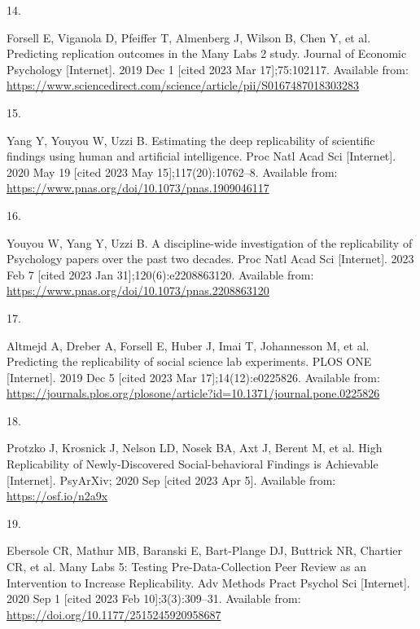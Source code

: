 \documentclass[
  english,
  a4paper,
]{article}
\newlength{\cslhangindent}
\newlength{\csllabelwidth}
\newlength{\cslentryspacingunit} %
\newenvironment{CSLReferences}[2] %
 {%
  \setlength{\parindent}{0pt}
  \ifodd #1
  \let\oldpar\par
  \def\par{\hangindent=\cslhangindent\oldpar}
  \fi
  \setlength{\parskip}{#2\cslentryspacingunit}
 }%
 {}
\newcommand{\CSLLeftMargin}[1]{\parbox[t]{\csllabelwidth}{#1}}
\newcommand{\CSLRightInline}[1]{\parbox[t]{\linewidth - \csllabelwidth}{#1}\break}
\begin{document}
\begin{CSLReferences}{0}{0}
\leavevmode{}%
\CSLLeftMargin{14. }%
\CSLRightInline{Forsell E, Viganola D, Pfeiffer T, Almenberg J, Wilson B, Chen Y, et al. Predicting replication outcomes in the {Many Labs} 2 study. Journal of Economic Psychology {[}Internet{]}. 2019 Dec 1 {[}cited 2023 Mar 17{]};75:102117. Available from: \url{https://www.sciencedirect.com/science/article/pii/S0167487018303283}}

\leavevmode{}%
\CSLLeftMargin{15. }%
\CSLRightInline{Yang Y, Youyou W, Uzzi B. Estimating the deep replicability of scientific findings using human and artificial intelligence. Proc Natl Acad Sci {[}Internet{]}. 2020 May 19 {[}cited 2023 May 15{]};117(20):10762--8. Available from: \url{https://www.pnas.org/doi/10.1073/pnas.1909046117}}

\leavevmode{}%
\CSLLeftMargin{16. }%
\CSLRightInline{Youyou W, Yang Y, Uzzi B. A discipline-wide investigation of the replicability of {Psychology} papers over the past two decades. Proc Natl Acad Sci {[}Internet{]}. 2023 Feb 7 {[}cited 2023 Jan 31{]};120(6):e2208863120. Available from: \url{https://www.pnas.org/doi/10.1073/pnas.2208863120}}

\leavevmode{}%
\CSLLeftMargin{17. }%
\CSLRightInline{Altmejd A, Dreber A, Forsell E, Huber J, Imai T, Johannesson M, et al. Predicting the replicability of social science lab experiments. PLOS ONE {[}Internet{]}. 2019 Dec 5 {[}cited 2023 Mar 17{]};14(12):e0225826. Available from: \url{https://journals.plos.org/plosone/article?id=10.1371/journal.pone.0225826}}

\leavevmode{}%
\CSLLeftMargin{18. }%
\CSLRightInline{Protzko J, Krosnick J, Nelson LD, Nosek BA, Axt J, Berent M, et al. High {Replicability} of {Newly-Discovered Social-behavioral Findings} is {Achievable} {[}Internet{]}. {PsyArXiv}; 2020 Sep {[}cited 2023 Apr 5{]}. Available from: \url{https://osf.io/n2a9x}}

\leavevmode{}%
\CSLLeftMargin{19. }%
\CSLRightInline{Ebersole CR, Mathur MB, Baranski E, Bart-Plange DJ, Buttrick NR, Chartier CR, et al. Many {Labs} 5: {Testing Pre-Data-Collection Peer Review} as an {Intervention} to {Increase Replicability}. Adv Methods Pract Psychol Sci {[}Internet{]}. 2020 Sep 1 {[}cited 2023 Feb 10{]};3(3):309--31. Available from: \url{https://doi.org/10.1177/2515245920958687}}


\end{CSLReferences}
\end{document}
